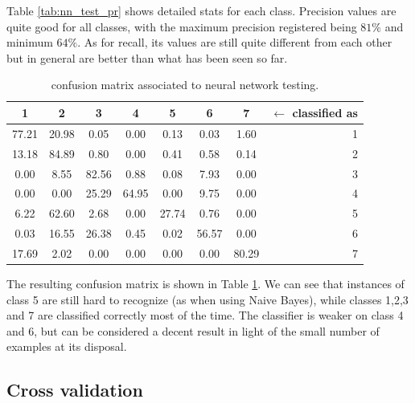 \documentclass[a4paper, 10pt]{article}
\begin{document}
Table \ref{tab:nn_test_pr} shows detailed stats for each class. Precision values are quite good for all classes, with the maximum precision registered being $81\%$ and minimum $64\%$. As for recall, its values are still quite different from each other but in general are better than what has been seen so far. 

\begin{table}[H]
\centering
\begin{tabular}{|*{7}{c|}r|}
\hline

1 &2 &3 &4 &5 &6 &7 & $\leftarrow$ classified as \\\hline

\cellcolor{black!15}77.21 &20.98 &0.05 &0.00 &0.13 &0.03 &1.60 & 1 \\\hline

13.18 &\cellcolor{black!15}84.89 &0.80 &0.00 &0.41 &0.58 &0.14 & 2 \\\hline

0.00 &8.55 &\cellcolor{black!15}82.56 &0.88 &0.08 &7.93 &0.00 & 3 \\\hline

0.00 &0.00 &25.29 &\cellcolor{black!15}64.95 &0.00 &9.75 &0.00 & 4 \\\hline

6.22 &62.60 &2.68 &0.00 &\cellcolor{black!15}27.74 &0.76 &0.00 & 5 \\\hline

0.03 &16.55 &26.38 &0.45 &0.02 &\cellcolor{black!15}56.57 &0.00 & 6 \\\hline

17.69 &2.02 &0.00 &0.00 &0.00 &0.00 &\cellcolor{black!15}80.29 & 7 \\\hline

\end{tabular}
\caption{confusion matrix associated to neural network testing.}
\label{tab:nn_cf}
\end{table}

The resulting confusion matrix is shown in Table \ref{tab:nn_cf}. We can see that instances of class 5 are still hard to recognize (as when using Naive Bayes), while classes 1,2,3 and 7 are classified correctly most of the time. The classifier is weaker on class 4 and 6, but can be considered a decent result in light of the small number of examples at its disposal. 

\subsection{Cross validation}
\end{document}
